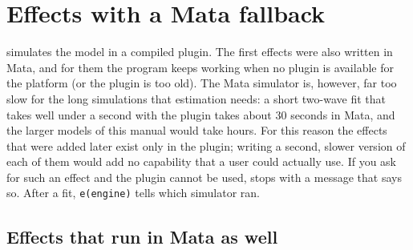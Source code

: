 \chapter{Effects with a Mata fallback}\label{app:mata}

\nwsaom{} simulates the model in a compiled plugin. The first effects were also written in Mata, and for them the program keeps working when no plugin is available for the platform (or the plugin is too old). The Mata simulator is, however, far too slow for the long simulations that estimation needs: a short two-wave fit that takes well under a second with the plugin takes about 30 seconds in Mata, and the larger models of this manual would take hours. For this reason the effects that were added later exist only in the plugin; writing a second, slower version of each of them would add no capability that a user could actually use. If you ask for such an effect and the plugin cannot be used, \nwsaom{} stops with a message that says so. After a fit, \texttt{e(engine)} tells which simulator ran.

\section{Effects that run in Mata as well}

